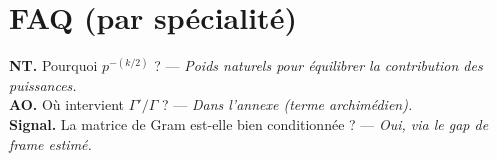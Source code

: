 \section{FAQ (par spécialité)}
\textbf{NT.} Pourquoi $p^{-(k/2)}$ ? — \textit{Poids naturels pour équilibrer la contribution des puissances.}\\
\textbf{AO.} Où intervient $\Gamma'/\Gamma$ ? — \textit{Dans l’annexe (terme archimédien).}\\
\textbf{Signal.} La matrice de Gram est-elle bien conditionnée ? — \textit{Oui, via le gap de frame estimé.}
